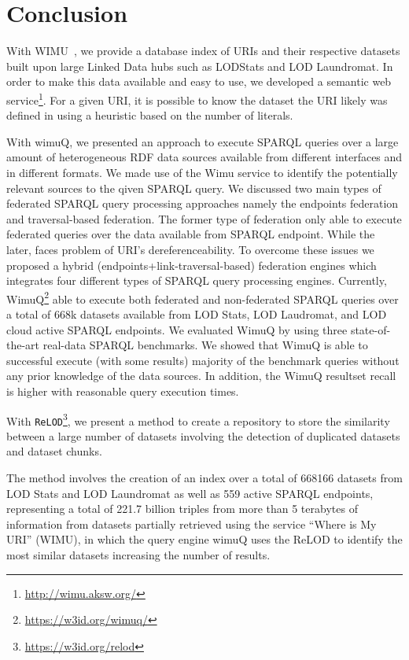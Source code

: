 \documentclass[sw]{iosart2x}
\begin{document}
\section{Conclusion}
\label{sec:conc}

With WIMU~\cite{valdestilhas2018my}, we provide a database index of URIs and their respective datasets built upon large Linked Data hubs such as LODStats and LOD Laundromat.
In order to make this data available and easy to use, we developed a semantic web service\footnote{\url{http://wimu.aksw.org/}}.
For a given URI, it is possible to know the dataset the URI likely was defined in using a heuristic based on the number of literals.

With wimuQ\cite{valdestilhas2019more}, we presented an approach to execute SPARQL queries over a large amount of heterogeneous RDF data sources available from different interfaces and in different formats. We made use of the Wimu service to identify the potentially relevant sources to the qiven SPARQL query. We discussed two main types of federated SPARQL query processing approaches namely the endpoints federation and traversal-based federation. The former type of federation only able to execute federated queries over the data available from SPARQL endpoint. While the later, faces problem of URI's dereferenceability. To overcome these issues we proposed a hybrid (endpoints+link-traversal-based) federation engines which integrates four different types of SPARQL query processing engines. Currently, WimuQ\footnote{\url{https://w3id.org/wimuq/}} able to execute both federated and non-federated SPARQL queries over a total of 668k datasets available from LOD Stats, LOD Laudromat, and LOD cloud active SPARQL endpoints. We evaluated WimuQ by using three state-of-the-art real-data SPARQL benchmarks. We showed that WimuQ is able to successful execute (with some results) majority of the benchmark queries without any prior knowledge of the data sources. In addition, the WimuQ resultset recall is higher with reasonable query execution times. 

With \texttt{ReLOD}\footnote{\url{https://w3id.org/relod}}, we present a method to create a repository to store the similarity between a large number of datasets involving the detection of duplicated datasets and dataset chunks.

The method involves the creation of an index over a total of \num{668166} datasets from LOD Stats and LOD Laundromat as well as 559 active SPARQL endpoints, representing a total of 221.7 billion triples from more than 5 terabytes of information from datasets partially retrieved using the service ``Where is My URI'' (WIMU)\cite{valdestilhas2018my}, in which the query engine wimuQ\cite{valdestilhas2019more} uses the ReLOD to identify the most similar datasets increasing the number of results. 
\end{document}
